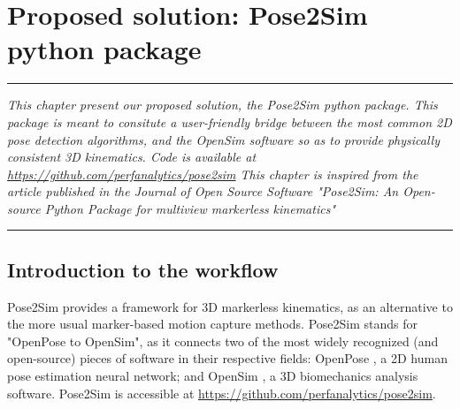 
\lhead[\fancyplain{}{\leftmark}]%
      {\fancyplain{}{}} %
\chead[\fancyplain{}{}]%
      {\fancyplain{}{}}
\rhead[\fancyplain{}{}]%
      {\fancyplain{}{\rightmark}}%
\lfoot[\fancyplain{}{}]%
      {\fancyplain{}{}}
\cfoot[\fancyplain{}{\thepage}]%
      {\fancyplain{}{\thepage}} %
\rfoot[\fancyplain{}{}]%
     {\fancyplain{}{\scriptsize}}



\chapter[Pose2Sim]{Proposed solution: Pose2Sim python package}
\label{ch:3}


\begin{center}
\rule{0.7\linewidth}{.5pt}
\begin{minipage}{0.7\linewidth}
\smallskip

\textit{This chapter present our proposed solution, the Pose2Sim python package. This package is meant to consitute a user-friendly bridge between the most common 2D pose detection algorithms, and the OpenSim software so as to provide physically consistent 3D kinematics. Code is available at \url{https://github.com/perfanalytics/pose2sim} \newline \newline
This chapter is inspired from the article published in the Journal of Open Source Software "Pose2Sim: An Open-source Python Package for multiview markerless kinematics" \cite{Pagnon2022b} }

\end{minipage}
\smallskip
\rule{0.7\linewidth}{.5pt}
\end{center}

\minitoc
\newpage


\section{Introduction to the workflow}
Pose2Sim provides a framework for 3D markerless kinematics, as an alternative to the more usual marker-based motion capture methods. Pose2Sim stands for "OpenPose to OpenSim", as it connects two of the most widely recognized (and open-source) pieces of software in their respective fields: OpenPose \cite{Cao2019}, a 2D human pose estimation neural network; and OpenSim \cite{Delp2007,Seth2018}, a 3D biomechanics analysis software. Pose2Sim is accessible at \url{https://github.com/perfanalytics/pose2sim}.

